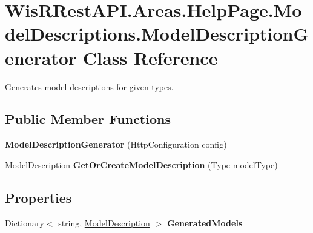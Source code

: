\hypertarget{class_wis_r_rest_a_p_i_1_1_areas_1_1_help_page_1_1_model_descriptions_1_1_model_description_generator}{}\section{Wis\+R\+Rest\+A\+P\+I.\+Areas.\+Help\+Page.\+Model\+Descriptions.\+Model\+Description\+Generator Class Reference}
\label{class_wis_r_rest_a_p_i_1_1_areas_1_1_help_page_1_1_model_descriptions_1_1_model_description_generator}


Generates model descriptions for given types.  


\subsection*{Public Member Functions}
\begin{DoxyCompactItemize}
\item 
\hypertarget{class_wis_r_rest_a_p_i_1_1_areas_1_1_help_page_1_1_model_descriptions_1_1_model_description_generator_a10782050973c4a48ed4aa049eeebbaa6}{}{\bfseries Model\+Description\+Generator} (Http\+Configuration config)\label{class_wis_r_rest_a_p_i_1_1_areas_1_1_help_page_1_1_model_descriptions_1_1_model_description_generator_a10782050973c4a48ed4aa049eeebbaa6}

\item 
\hypertarget{class_wis_r_rest_a_p_i_1_1_areas_1_1_help_page_1_1_model_descriptions_1_1_model_description_generator_a4e98e38e7940d652436709c49f7fb9a7}{}\hyperlink{class_wis_r_rest_a_p_i_1_1_areas_1_1_help_page_1_1_model_descriptions_1_1_model_description}{Model\+Description} {\bfseries Get\+Or\+Create\+Model\+Description} (Type model\+Type)\label{class_wis_r_rest_a_p_i_1_1_areas_1_1_help_page_1_1_model_descriptions_1_1_model_description_generator_a4e98e38e7940d652436709c49f7fb9a7}

\end{DoxyCompactItemize}
\subsection*{Properties}
\begin{DoxyCompactItemize}
\item 
\hypertarget{class_wis_r_rest_a_p_i_1_1_areas_1_1_help_page_1_1_model_descriptions_1_1_model_description_generator_a7d6ab14ce7100c5d4bbe8a43ace906b8}{}Dictionary$<$ string, \hyperlink{class_wis_r_rest_a_p_i_1_1_areas_1_1_help_page_1_1_model_descriptions_1_1_model_description}{Model\+Description} $>$ {\bfseries Generated\+Models}\label{class_wis_r_rest_a_p_i_1_1_areas_1_1_help_page_1_1_model_descriptions_1_1_model_description_generator_a7d6ab14ce7100c5d4bbe8a43ace906b8}

\end{DoxyCompactItemize}


